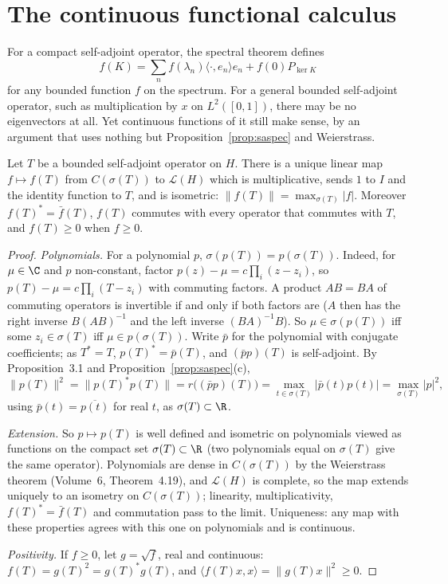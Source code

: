 \section{The continuous functional calculus}

For a compact self-adjoint operator, the spectral theorem defines
\[
f(K)=\sum_nf(\lambda_n)\langle\cdot,e_n\rangle e_n+f(0)P_{\ker K}
\]
 for any bounded function $f$ on the spectrum. For a general bounded self-adjoint operator, such as
multiplication by $x$ on $L^2([0,1])$, there may be no eigenvectors at all. Yet continuous functions of it still make sense, by an argument that uses nothing but Proposition~\ref{prop:saspec} and Weierstrass.

\begin{theorem}\label{thm:funcalc}
Let $T$ be a bounded self-adjoint operator on $H$. There is a unique linear map $f\mapsto f(T)$ from $C(\sigma(T))$ to $\mathcal L(H)$ which is multiplicative, sends $1$ to $I$ and the identity function to $T$, and is
isometric: $\|f(T)\|=\max_{\sigma(T)}|f|$. Moreover $f(T)^*=\bar f(T)$, $f(T)$ commutes with every operator that commutes with $T$, and $f(T)\ge0$ when $f\ge0$.
\end{theorem}
\begin{proof}
\emph{Polynomials.} For a polynomial $p$, $\sigma(p(T))=p(\sigma(T))$. Indeed, for $\mu\in\C$ and $p$ non-constant, factor $p(z)-\mu=c\prod_i(z-z_i)$, so $p(T)-\mu=c\prod_i(T-z_i)$ with commuting factors. A product $AB=BA$ of
commuting operators is invertible if and only if both factors are ($A$ then has the right inverse $B(AB)^{-1}$ and the left inverse $(BA)^{-1}B$). So $\mu\in\sigma(p(T))$ iff some $z_i\in\sigma(T)$ iff $\mu\in p(\sigma(T))$.
Write $\bar p$ for the polynomial with conjugate coefficients; as $T^*=T$, $p(T)^*=\bar p(T)$, and $(\bar pp)(T)$ is self-adjoint. By Proposition~3.1 and Proposition~\ref{prop:saspec}(c),
\[\|p(T)\|^2=\|p(T)^*p(T)\|=r\bigl((\bar pp)(T)\bigr)=\max_{t\in\sigma(T)}|\bar p(t)p(t)|=\max_{\sigma(T)}|p|^2,\]
using $\bar p(t)=\overline{p(t)}$ for real $t$, as $\sigma(T)\subset\R$.

\emph{Extension.} So $p\mapsto p(T)$ is well defined and isometric on polynomials viewed as functions on the compact set $\sigma(T)\subset\R$ (two polynomials equal on $\sigma(T)$ give the same operator). Polynomials are dense in
$C(\sigma(T))$ by the Weierstrass theorem (Volume~6, Theorem~4.19), and $\mathcal L(H)$ is complete, so the map extends uniquely to an isometry on $C(\sigma(T))$; linearity, multiplicativity, $f(T)^*=\bar f(T)$ and commutation
pass to the limit. Uniqueness: any map with these properties agrees with this one on polynomials and is continuous.

\emph{Positivity.} If $f\ge0$, let $g=\sqrt f$, real and continuous: $f(T)=g(T)^2=g(T)^*g(T)$, and $\langle f(T)x,x\rangle=\|g(T)x\|^2\ge0$.
\end{proof}

